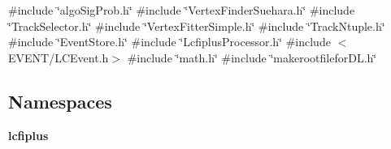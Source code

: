 {\ttfamily \#include \char`\"{}algo\+Sig\+Prob.\+h\char`\"{}}\newline
{\ttfamily \#include \char`\"{}Vertex\+Finder\+Suehara.\+h\char`\"{}}\newline
{\ttfamily \#include \char`\"{}Track\+Selector.\+h\char`\"{}}\newline
{\ttfamily \#include \char`\"{}Vertex\+Fitter\+Simple.\+h\char`\"{}}\newline
{\ttfamily \#include \char`\"{}Track\+Ntuple.\+h\char`\"{}}\newline
{\ttfamily \#include \char`\"{}Event\+Store.\+h\char`\"{}}\newline
{\ttfamily \#include \char`\"{}Lcfiplus\+Processor.\+h\char`\"{}}\newline
{\ttfamily \#include $<$E\+V\+E\+N\+T/\+L\+C\+Event.\+h$>$}\newline
{\ttfamily \#include \char`\"{}math.\+h\char`\"{}}\newline
{\ttfamily \#include \char`\"{}makerootfilefor\+D\+L.\+h\char`\"{}}\newline
\subsection*{Namespaces}
\begin{DoxyCompactItemize}
\item 
 \textbf{ lcfiplus}
\end{DoxyCompactItemize}
